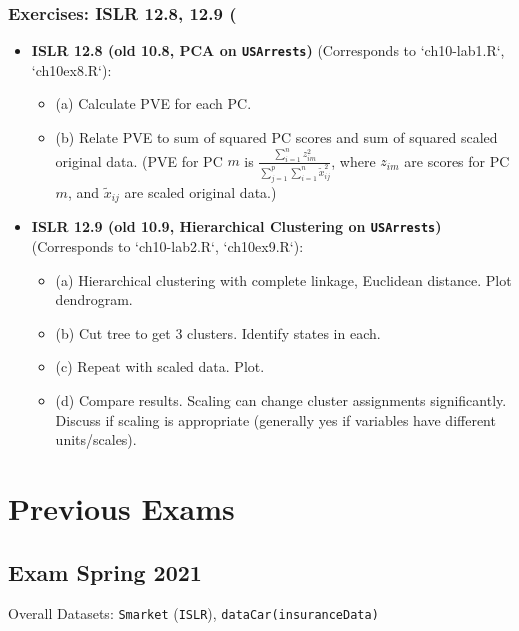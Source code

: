 \documentclass[12pt,a4paper]{article}
\newcommand{\Rpackage}[1]{\texttt{#1}} %
\newcommand{\Robject}[1]{\texttt{#1}} %
\begin{document}
    \subsubsection{Exercises: ISLR 12.8, 12.9 (}
        \begin{itemize}
            \item \textbf{ISLR 12.8 (old 10.8, PCA on \Robject{USArrests})} (Corresponds to `ch10-lab1.R`, `ch10ex8.R`):
                \begin{itemize}
                    \item (a) Calculate PVE for each PC.
                    \item (b) Relate PVE to sum of squared PC scores and sum of squared scaled original data. (PVE for PC $m$ is $\frac{\sum_{i=1}^n z_{im}^2}{\sum_{j=1}^p \sum_{i=1}^n \tilde{x}_{ij}^2}$, where $z_{im}$ are scores for PC $m$, and $\tilde{x}_{ij}$ are scaled original data.)
                \end{itemize}
            \item \textbf{ISLR 12.9 (old 10.9, Hierarchical Clustering on \Robject{USArrests})} (Corresponds to `ch10-lab2.R`, `ch10ex9.R`):
                \begin{itemize}
                    \item (a) Hierarchical clustering with complete linkage, Euclidean distance. Plot dendrogram.
                    \item (b) Cut tree to get 3 clusters. Identify states in each.
                    \item (c) Repeat with scaled data. Plot.
                    \item (d) Compare results. Scaling can change cluster assignments significantly. Discuss if scaling is appropriate (generally yes if variables have different units/scales).
                \end{itemize}
        \end{itemize}


\section{Previous Exams}
\subsection{Exam Spring 2021 }
\vspace{0.5em}
Overall Datasets: \Robject{Smarket} (\Rpackage{ISLR}), 
\Robject{dataCar(\Rpackage{insuranceData})}
\vspace{0.5em}
\end{document}
